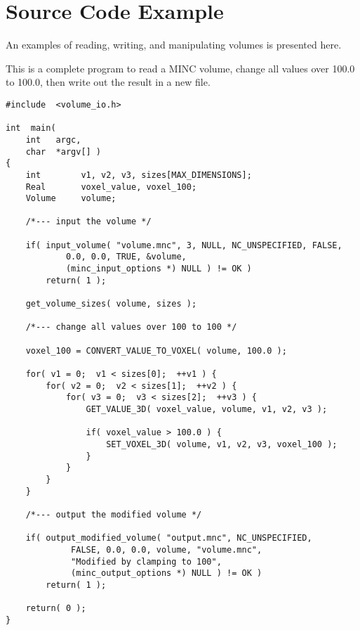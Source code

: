 
\section{Source Code Example}

An examples of reading, writing, and manipulating volumes is
presented here.

This is a complete program to read a MINC volume, change all values
over 100.0 to 100.0, then write out the result in a new file.

{\small
\begin{verbatim}
#include  <volume_io.h>

int  main(
    int   argc,
    char  *argv[] )
{
    int        v1, v2, v3, sizes[MAX_DIMENSIONS];
    Real       voxel_value, voxel_100;
    Volume     volume;

    /*--- input the volume */

    if( input_volume( "volume.mnc", 3, NULL, NC_UNSPECIFIED, FALSE,
            0.0, 0.0, TRUE, &volume,
            (minc_input_options *) NULL ) != OK )
        return( 1 );

    get_volume_sizes( volume, sizes );

    /*--- change all values over 100 to 100 */

    voxel_100 = CONVERT_VALUE_TO_VOXEL( volume, 100.0 );

    for( v1 = 0;  v1 < sizes[0];  ++v1 ) {
        for( v2 = 0;  v2 < sizes[1];  ++v2 ) {
            for( v3 = 0;  v3 < sizes[2];  ++v3 ) {
                GET_VALUE_3D( voxel_value, volume, v1, v2, v3 );

                if( voxel_value > 100.0 ) {
                    SET_VOXEL_3D( volume, v1, v2, v3, voxel_100 );
                }
            }
        }
    }

    /*--- output the modified volume */

    if( output_modified_volume( "output.mnc", NC_UNSPECIFIED,
             FALSE, 0.0, 0.0, volume, "volume.mnc",
             "Modified by clamping to 100",
             (minc_output_options *) NULL ) != OK )
        return( 1 );

    return( 0 );
}
\end{verbatim}
}

